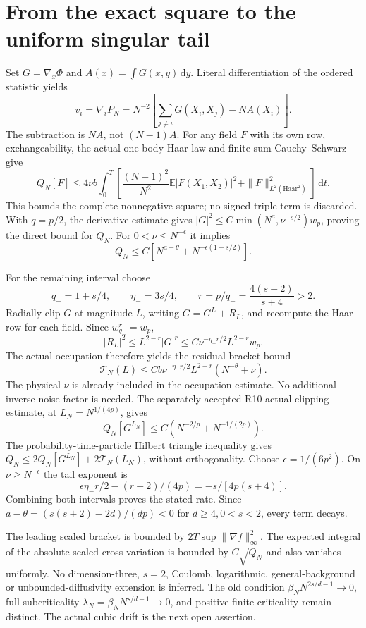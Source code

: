 \documentclass[10pt]{article}
\newcommand{\E}{\mathbb E}
\newcommand{\dd}{\,\mathrm d}
\begin{document}
\newpage
\section*{From the exact square to the uniform singular tail}
Set $G=\nabla_x\Phi$ and $A(x)=\int G(x,y)\dd y$. Literal differentiation
of the ordered statistic yields
\[
 v_i=\nabla_iP_N=N^{-2}\left[\sum_{j\ne i}G(X_i,X_j)-NA(X_i)\right].
\]
The subtraction is $N A$, not $(N-1)A$. For any field $F$ with its own row,
exchangeability, the actual one-body Haar law and finite-sum
Cauchy--Schwarz give
\[
 Q_N[F]\le4\nu b\int_0^T\left[
 \frac{(N-1)^2}{N^2}\E|F(X_1,X_2)|^2+\|F\|_{L^2(\mathrm{Haar}^2)}^2
 \right]\dd t.
\]
This bounds the complete nonnegative square; no signed triple term is
discarded. With $q=p/2$, the derivative estimate gives
$|G|^2\le C\min(N^a,\nu^{-s/2})w_p$, proving the direct bound for $Q_N$.
For $0<\nu\le N^{-\epsilon}$ it implies
\[
 Q_N\le C[N^{a-\theta}+N^{-\epsilon(1-s/2)}].
\]

For the remaining interval choose
\[
 q_-=1+s/4,\qquad\eta_-=3s/4,\qquad
 r=p/q_-=\frac{4(s+2)}{s+4}>2.
\]
Radially clip $G$ at magnitude $L$, writing $G=G^L+R_L$, and recompute the
Haar row for each field. Since $w_{q_-}^r=w_p$,
\[
 |R_L|^2\le L^{2-r}|G|^r
 \le C\nu^{-\eta_-r/2}L^{2-r}w_p.
\]
The actual occupation therefore yields the residual bracket bound
\[
 \mathcal T_N(L)\le Cb\nu^{-\eta_-r/2}L^{2-r}(N^{-\theta}+\nu).
\]
The physical $\nu$ is already included in the occupation estimate.
No additional inverse-noise factor is needed.
The separately accepted R10 actual clipping estimate, at
$L_N=N^{1/(4p)}$, gives
\[
 Q_N[G^{L_N}]\le C(N^{-2/p}+N^{-1/(2p)}).
\]
The probability-time-particle Hilbert triangle inequality gives
$Q_N\le2Q_N[G^{L_N}]+2\mathcal T_N(L_N)$, without orthogonality.
Choose $\epsilon=1/(6p^2)$. On $\nu\ge N^{-\epsilon}$ the tail exponent is
\[
 \epsilon\eta_-r/2-(r-2)/(4p)=-s/[4p(s+4)].
\]
Combining both intervals proves the stated rate. Since
$a-\theta=(s(s+2)-2d)/(dp)<0$ for $d\ge4,0<s<2$, every term decays.

The leading scaled bracket is bounded by $2T\sup\|\nabla f\|_\infty^2$.
The expected integral of the absolute scaled cross-variation is bounded
by $C\sqrt{Q_N}$ and also vanishes uniformly. No dimension-three, $s=2$,
Coulomb, logarithmic, general-background or unbounded-diffusivity extension
is inferred. The old condition $\beta_NN^{2s/d-1}\to0$, full subcriticality
$\lambda_N=\beta_NN^{s/d-1}\to0$, and positive finite criticality remain
distinct. The actual cubic drift is the next open assertion.
\end{document}
